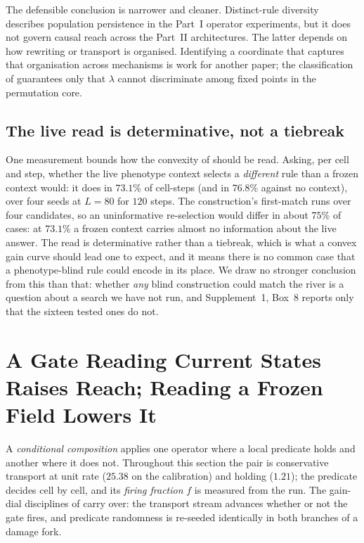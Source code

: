 \documentclass[man,12pt,floatsintext,donotrepeattitle]{apa7}
\newcommand{\secref}[1]{\emph{\nameref{#1}}}
\newcommand{\suppfindingref}[1]{Supplement~1, Box~#1}
\begin{document}
The defensible conclusion is narrower and cleaner. Distinct-rule diversity
describes population persistence in the Part~I operator experiments, but it
does not govern causal reach across the Part~II architectures. The latter
depends on how rewriting or transport is organised. Identifying a coordinate
that captures that organisation across mechanisms is work for another paper;
the classification of \secref{sec:classification} guarantees only that
$\lambda$ cannot discriminate among fixed points in the permutation core.



\subsection{The live read is determinative, not a tiebreak}

One measurement bounds how the convexity of \secref{sec:gain} should be read.
Asking, per cell and step, whether the live phenotype context selects a
\emph{different} rule than a frozen context would: it does in $73.1$\% of
cell-steps (and in $76.8$\% against no context), over four seeds at $L=80$ for
$120$ steps. The construction's first-match runs over four candidates, so an
uninformative re-selection would differ in about $75$\% of cases: at $73.1$\% a
frozen context carries almost no information about the live answer. The read is
determinative rather than a tiebreak, which is what a convex gain curve should
lead one to expect, and it means there is no common case that a
phenotype-blind rule could encode in its place. We draw no stronger conclusion
from this than that: whether \emph{any} blind construction could match the
river is a question about a search we have not run, and
\suppfindingref{8} reports only that the sixteen tested ones do not.

\section{A Gate Reading Current States Raises Reach; Reading a Frozen Field Lowers It}
\label{sec:endogenous-gain}

A \emph{conditional composition} applies one operator where a local predicate
holds and another where it does not. Throughout this section the pair is
conservative transport at unit rate ($25.38$ on the \secref{sec:causal}
calibration) and holding ($1.21$); the predicate decides cell by cell, and its
\emph{firing fraction} $f$ is measured from the run. The gain-dial
disciplines of \secref{sec:gain} carry over: the transport stream advances
whether or not the gate fires, and predicate randomness is re-seeded
identically in both branches of a damage fork.
\end{document}
